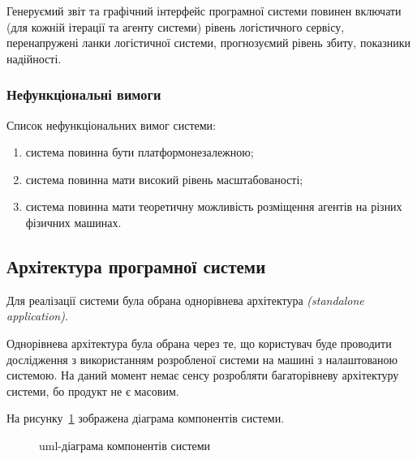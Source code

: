 Генеруємий звіт та графічний інтерфейс програмної системи повинен включати (для кожній ітерації та агенту системи) рівень логістичного сервісу, перенапружені ланки логістичної системи, прогнозуємий рівень збиту, показники надійності.

\subsubsection{Нефункціональні вимоги}
Список нефункціональних вимог системи:
\begin{enumerate}[label={\arabic*)}]
	\item система повинна бути платформонезалежною;
	\item система повинна мати високий рівень масштабованості;
	\item система повинна мати теоретичну можливість розміщення агентів на різних фізичних машинах.
\end{enumerate}

\subsection{Архітектура програмної системи}
Для реалізації системи була обрана однорівнева архітектура \textit{(standalone application)}.

Однорівнева архітектура була обрана через те, що користувач буде проводити дослідження з використанням розробленої системи на машині з налаштованою системою. 
На даний момент немає сенсу розробляти багаторівневу архітектуру системи, бо продукт не є масовим.

На рисунку~\ref{fig:system_component} зображена діаграма компонентів системи.

\begin{figure}[H]
	\centering


	\caption{\acrshort{uml}-діаграма компонентів системи}
	\label{fig:system_component}
\end{figure} 

